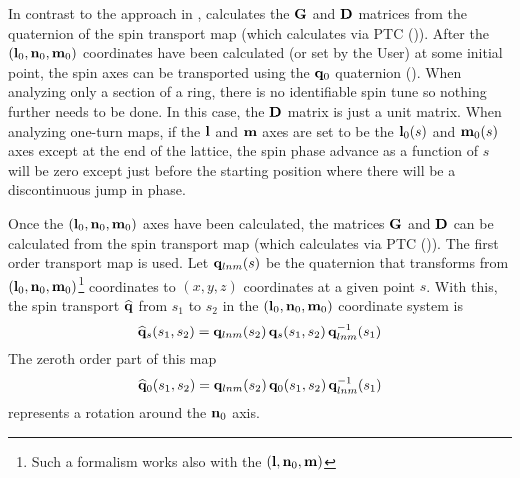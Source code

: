 In contrast to the approach in \cite{b:barber85,b:barber99}, \bmad calculates the ${\bf G}$ and ${\bf D}$
matrices from the quaternion of the spin transport map (which \bmad calculates via PTC
()). After the $({\bf l}_0, {\bf n}_0, {\bf m}_0)$ coordinates have been calculated (or set by
the User) at some initial point, the spin axes can be transported using the ${\bf q}_0$ quaternion
(). When analyzing only a section of a ring, there is no identifiable spin tune so nothing
further needs to be done. In this case, the ${\bf D}$ matrix is just a unit matrix. When analyzing
one-turn maps, if the ${\bf l}$ and ${\bf m}$ axes are set to be the ${\bf l}_0(s)$ and ${\bf m}_0(s)$ axes
except at the end of the lattice, the spin phase advance as a function of $s$ will be zero except
just before the starting position where there will be a discontinuous jump in phase.

Once the $({\bf l}_0, {\bf n}_0, {\bf m}_0)$ axes have been calculated, the matrices ${\bf G}$ and ${\bf D}$ can be
calculated from the spin transport map (which \bmad calculates via PTC ()).  The
first order transport map  is used. Let ${\bf q}_{lnm}(s)$ be the quaternion that transforms
from $({\bf l}_0, {\bf n}_0, {\bf m}_0)$\footnote{ Such a formalism works also with the $({\bf l}, {\bf n}_0,
{\bf m})$} coordinates to $(x, y, z)$ coordinates at a given point $s$. With this, the spin transport
$\widehat{{\bf q}}$ from $s_1$ to $s_2$ in the $({\bf l}_0, {\bf n}_0, {\bf m}_0)$ coordinate system is
\begin{equation}
  \widehat{{\bf q}}_s(s_1, s_2) = {\bf q}_{lnm}(s_2) \, {\bf q}_s(s_1, s_2) \, {\bf q}_{lnm}^{-1}(s_1)
\end{equation}
The zeroth order part of this map 
\begin{equation}
  \widehat{{\bf q}}_0(s_1,s_2) = {\bf q}_{lnm}(s_2) \, {\bf q}_0(s_1, s_2) \, {\bf q}_{lnm}^{-1}(s_1) 
\end{equation}
represents a rotation around the ${\bf n}_0$ axis. 

